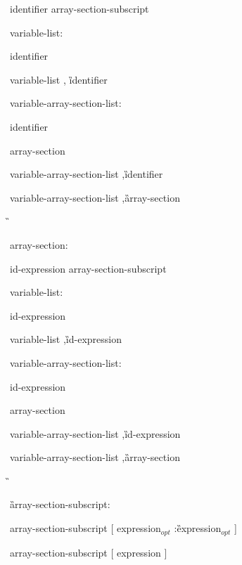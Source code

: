 {\I identifier array-section-subscript

variable-list:

\I identifier

\I variable-list \C, \G identifier

variable-array-section-list:

\I identifier

\I array-section

\I variable-array-section-list \C ,\G identifier

\I variable-array-section-list \C ,\G array-section

\G\cspecificend

\cppspecificstart

\I array-section:

\I id-expression array-section-subscript

variable-list:

\I id-expression

\I variable-list \C ,\G id-expression

variable-array-section-list:

\I id-expression

\I array-section

\I variable-array-section-list \C ,\G id-expression

\I variable-array-section-list \C ,\G array-section

\G\cppspecificend

\G array-section-subscript:

\I array-section-subscript [ expression$_{opt}$ \C :\G expression$_{opt}$ ]

\I array-section-subscript [ expression ]


\I [ expression ]

} %



